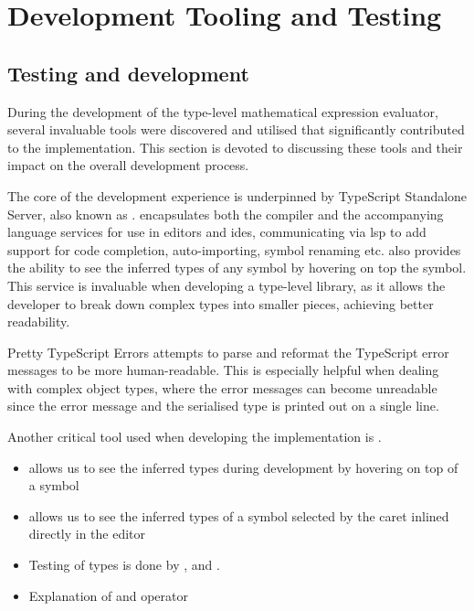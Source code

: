 \chapter{Development Tooling and Testing}

\section{Testing and development}

During the development of the type-level mathematical expression evaluator, several invaluable tools were discovered and utilised that significantly contributed to the implementation. This section is devoted to discussing these tools and their impact on the overall development process.

The core of the development experience is underpinned by TypeScript Standalone Server, also known as .  encapsulates both the compiler and the accompanying language services for use in editors and \acrshort{ide}s, communicating via \acrshort{lsp} to add support for code completion, auto-importing, symbol renaming etc.  also provides the ability to see the inferred types of any symbol by hovering on top the symbol. This service is invaluable when developing a type-level library, as it allows the developer to break down complex types into smaller pieces, achieving better readability.

Pretty TypeScript Errors \cite{balasianoPrettyTypeScriptErrors2023} attempts to parse and reformat the TypeScript error messages to be more human-readable. This is especially helpful when dealing with complex object types, where the error messages can become unreadable since the error message and the serialised type is printed out on a single line.


Another critical tool used when developing the implementation is  \cite{theroxVscodetwoslashqueries2023}.


\begin{itemize}
  \item {} allows us to see the inferred types during development by hovering on top of a symbol
  \item {} allows us to see the inferred types of a symbol selected by the caret inlined directly in the editor
  \item Testing of types is done by ,  and .
  \item Explanation of  and  operator
\end{itemize}

